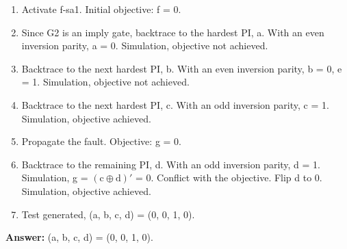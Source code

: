 
\begin{enumerate}
  \item Activate f-sa1. Initial objective: f = 0.
  \item Since G2 is an imply gate, backtrace to the hardest PI, a. With an even inversion parity, a = 0. Simulation, objective not achieved.
  \item Backtrace to the next hardest PI, b. With an even inversion parity, b = 0, e = 1. Simulation, objective not achieved.
  \item Backtrace to the next hardest PI, c. With an odd inversion parity, c = 1. Simulation, objective achieved.
  \item Propagate the fault. Objective: g = 0.
  \item Backtrace to the remaining PI, d. With an odd inversion parity, d = 1. Simulation, g = $(\text{c}\oplus\text{d})'$ = 0. Conflict with the objective. Flip d to 0. Simulation, objective achieved.
  \item Test generated, (a, b, c, d) = (0, 0, 1, 0).

\end{enumerate}

\textbf{Answer:} (a, b, c, d) = (0, 0, 1, 0).

